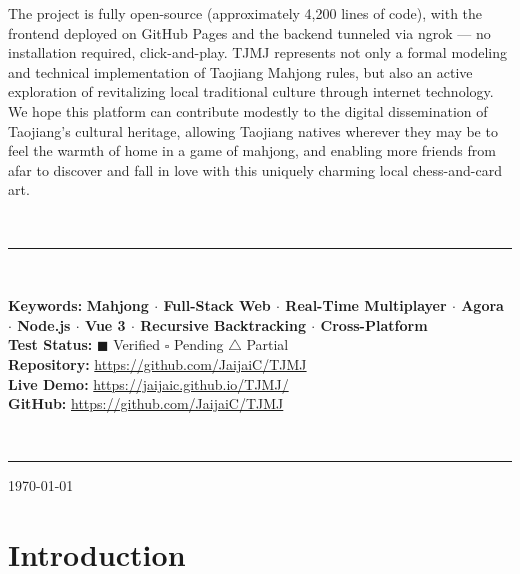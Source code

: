 \documentclass[11pt,a4paper]{article}
\begin{document}
\begin{center}
\begin{minipage}{0.95\linewidth}
The project is fully open-source (approximately 4,200 lines of code), with the frontend deployed on GitHub Pages and the backend tunneled via ngrok — no installation required, click-and-play. TJMJ represents not only a formal modeling and technical implementation of Taojiang Mahjong rules, but also an active exploration of revitalizing local traditional culture through internet technology. We hope this platform can contribute modestly to the digital dissemination of Taojiang's cultural heritage, allowing Taojiang natives wherever they may be to feel the warmth of home in a game of mahjong, and enabling more friends from afar to discover and fall in love with this uniquely charming local chess-and-card art.
\end{minipage}\\[2pt]
{\color{cyan!60!black}\rule{\linewidth}{0.5pt}}\\[2pt]
\begin{minipage}{0.95\linewidth}
\small\textbf{\color{blue!60!black}Keywords:} \textbf{Mahjong $\cdot$ Full-Stack Web $\cdot$ Real-Time Multiplayer $\cdot$ Agora $\cdot$ Node.js $\cdot$ Vue 3 $\cdot$ Recursive Backtracking $\cdot$ Cross-Platform} \\
\textbf{\color{blue!60!black}Test Status:} $\blacksquare$ Verified \quad $\square$ Pending \quad $\triangle$ Partial \\[2pt]
\textbf{\color{blue!60!black}Repository:} \url{https://github.com/JaijaiC/TJMJ} \\
\textbf{\color{blue!60!black}Live Demo:} \url{https://jaijaic.github.io/TJMJ/} \\
\textbf{\color{blue!60!black}GitHub:} \url{https://github.com/JaijaiC/TJMJ}
\end{minipage}\\[4pt]
{\color{cyan!60!black}\rule{\linewidth}{0.5pt}}
\end{center}

\vspace{6pt}
\begin{center}
{\small\color{gray}\today}
\end{center}

\newpage
\renewcommand{\contentsname}{\begin{center}Contents\end{center}}
\tableofcontents
\newpage

\section{Introduction}
\end{document}
